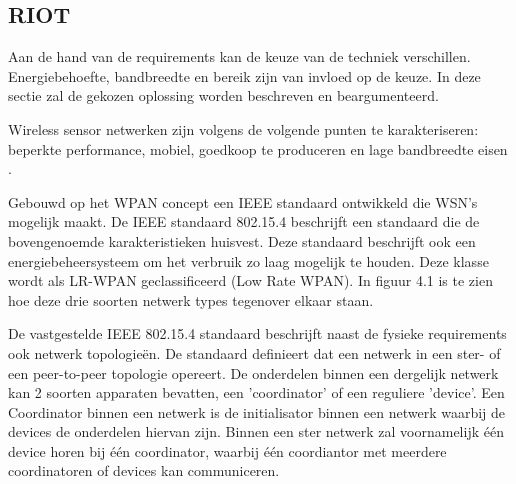 \documentclass{../local}
\begin{document}
\subsection{RIOT}


Aan de hand van de requirements kan de keuze van de techniek verschillen. Energiebehoefte, bandbreedte en bereik zijn van invloed op de keuze. In deze sectie zal de gekozen oplossing worden beschreven en beargumenteerd.

Wireless sensor netwerken zijn volgens de volgende punten te karakteriseren: beperkte performance, mobiel, goedkoop te produceren en lage bandbreedte eisen \cite{akyildiz2002wireless}.




Gebouwd op het WPAN concept een IEEE standaard ontwikkeld die WSN's mogelijk maakt. De IEEE standaard 802.15.4 beschrijft een standaard die de bovengenoemde karakteristieken huisvest. Deze standaard beschrijft ook een energiebeheersysteem om het verbruik zo laag mogelijk te houden. Deze klasse wordt als LR-WPAN geclassificeerd (Low Rate WPAN). In figuur 4.1 is te zien hoe deze drie soorten netwerk types tegenover elkaar staan.


De vastgestelde IEEE 802.15.4 standaard beschrijft naast de fysieke requirements ook netwerk topologieën. De standaard definieert dat een netwerk in een ster- of een peer-to-peer topologie opereert. De onderdelen binnen een dergelijk netwerk kan 2 soorten apparaten bevatten, een 'coordinator' of een reguliere 'device'. Een Coordinator binnen een netwerk is de initialisator binnen een netwerk waarbij de devices de onderdelen hiervan zijn. Binnen een ster netwerk zal voornamelijk één device horen bij één coordinator, waarbij één coordiantor met meerdere coordinatoren of devices kan communiceren.
\end{document}
